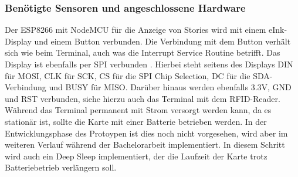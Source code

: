 \documentclass[12pt,titlepage]{scrartcl}
\begin{document}
			\subsubsection{Benötigte Sensoren und angeschlossene Hardware}
			Der ESP8266 mit NodeMCU für die Anzeige von Stories wird mit einem eInk-Display und einem Button verbunden. Die Verbindung mit dem Button verhält sich wie beim Terminal, auch was die Interrupt Service Routine betrifft. Das Display ist ebenfalls per SPI verbunden \cite{wavesharespecs}. Hierbei steht seitens des Displays DIN für MOSI, CLK für SCK, CS für die SPI Chip Selection, DC für die SDA-Verbindung und BUSY für MISO. Darüber hinaus werden ebenfalls 3.3V, GND und RST verbunden, siehe hierzu auch das Terminal mit dem RFID-Reader. Während das Terminal permanent mit Strom versorgt werden kann, da es stationär ist, sollte die Karte mit einer Batterie betrieben werden. In der Entwicklungsphase des Protoypen ist dies noch nicht vorgesehen, wird aber im weiteren Verlauf während der Bachelorarbeit implementiert. In diesem Schritt wird auch ein Deep Sleep implementiert, der die Laufzeit der Karte trotz Batteriebetrieb verlängern soll.
\end{document}
